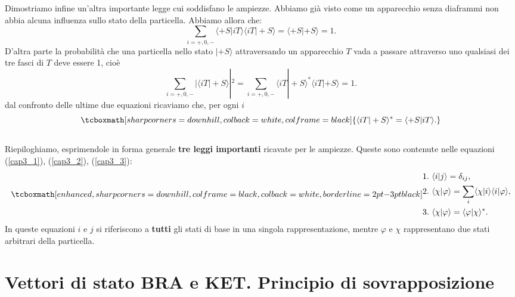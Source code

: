 \documentclass[a4paper,12pt,oneside]{book}
\begin{document}
Dimostriamo infine un'altra importante legge cui soddisfano le ampiezze. Abbiamo già visto come un apparecchio senza diaframmi non abbia alcuna influenza sullo stato della particella. Abbiamo allora che:
	\begin{equation}
	\sum \limits_{i=+,0,-}\langle +S | iT \rangle \langle iT | +S \rangle = \langle +S | +S \rangle =1 .
	\end{equation}
D'altra parte la probabilità che una particella nello stato $| +S \rangle$ attraversando un apparecchio $T$ vada a passare attraverso uno qualsiasi dei tre fasci di $T$ deve essere 1, cioè
	\begin{equation}
		\sum \limits_{i=+,0,-}|\langle iT | +S \rangle|^2= \sum \limits_{i=+,0,-} \langle iT | +S \rangle ^* \langle iT | +S \rangle= 1 .
	\end{equation}
dal confronto delle ultime due equazioni ricaviamo che, per ogni $i$
	\begin{equation}
 		\tcboxmath[sharp corners=downhill, colback=white, colframe=black]{
 			\langle iT | +S \rangle ^* = \langle +S | iT \rangle .
 			}
	\label{cap3_3}
	\end{equation}\\

Riepiloghiamo, esprimendole in forma generale \textbf{tre leggi importanti} ricavate per le ampiezze.
Queste sono contenute nelle equazioni (\ref{cap3_1}), (\ref{cap3_2}), (\ref{cap3_3}):
	\begin{equation}
		\tcboxmath[enhanced, sharp corners=downhill, colframe=black, colback=white, borderline={2pt}{-3pt}{black}]{
			\begin{aligned}
				&\textrm{1.}\ \langle i | j \rangle=\delta_{ij},\\
				&\textrm{2.}\ \langle \chi | \varphi \rangle=\sum \limits_{i} \langle \chi | i \rangle \langle i | \varphi \rangle,\\
				&\textrm{3.}\ \langle \chi | \varphi \rangle = \langle \varphi | \chi \rangle ^* .
			\end{aligned}
			}
	\end{equation}
In queste equazioni $i$ e $j$ si riferiscono a \textbf{tutti} gli stati di base in una singola rappresentazione, mentre $\varphi$ e $\chi$ rappresentano due stati arbitrari della particella.

\section[Principio di sovrapposizione]{Vettori di stato BRA e KET. Principio di sovrapposizione} 
\end{document}
